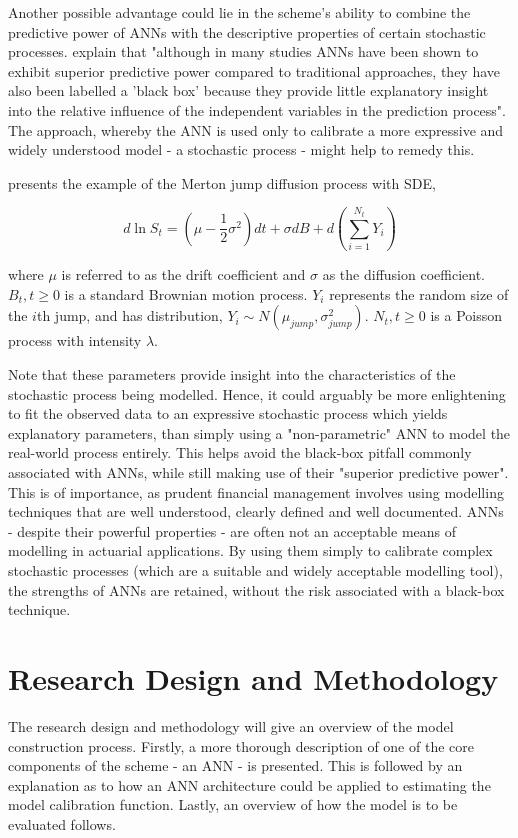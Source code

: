 \documentclass[11pt,oneside,openany,a4paper,english, report, goldenblock
]{usthesis}
\begin{document}
Another possible advantage could lie in the scheme's ability to combine the predictive power of ANNs with the descriptive properties of certain stochastic processes. \citet{Olden} explain that "although in many studies ANNs have been shown to exhibit superior predictive power compared to traditional approaches, they have also been labelled a 'black box' because they provide little explanatory insight into the relative influence of the independent variables in the prediction process". The approach, whereby the ANN is used only to calibrate a more expressive and widely understood model - a stochastic process - might help to remedy this.


\citet{Mongwe} presents the example of the Merton jump diffusion process with SDE,

\begin{equation}
	d \ln{S_t}= \left( \mu - \frac{1}{2} \sigma^2 \right )dt+\sigma dB +d \left( \sum_{i=1}^{N_t} Y_i \right )
\end{equation}

where $ \mu $  is referred to as the drift coefficient and $ \sigma $ as the diffusion coefficient. $ B_{t}, t\geq 0$ is a standard Brownian motion process. $Y_i$ represents the random size of the $i$th jump, and has distribution, $Y_i \sim N \left( \mu_{jump}, \sigma_{jump}^2 \right )$. $N_t, t \geq 0$ is a Poisson process with intensity $\lambda$.


Note that these parameters provide insight into the characteristics of the stochastic process being modelled. Hence, it could arguably be more enlightening to fit the observed data to an expressive stochastic process which yields explanatory parameters, than simply using a "non-parametric" ANN to model the real-world process entirely. This helps avoid the black-box pitfall commonly associated with ANNs, while still making use of their "superior predictive power". This is of importance, as prudent financial management involves using modelling techniques that are well understood, clearly defined and well documented. ANNs - despite their powerful properties - are often not an acceptable means of modelling in actuarial applications. By using them simply to calibrate complex stochastic processes (which are a suitable and widely acceptable modelling tool), the strengths of ANNs are retained, without the risk associated with a black-box technique.

\section{Research Design and Methodology}
The research design and methodology will give an overview of the model construction process. Firstly, a more thorough description of one of the core components of the scheme - an ANN - is presented. This is followed by an explanation as to how an ANN architecture could be applied to estimating the model calibration function. Lastly, an overview of how the model is to be evaluated follows.
\end{document}
